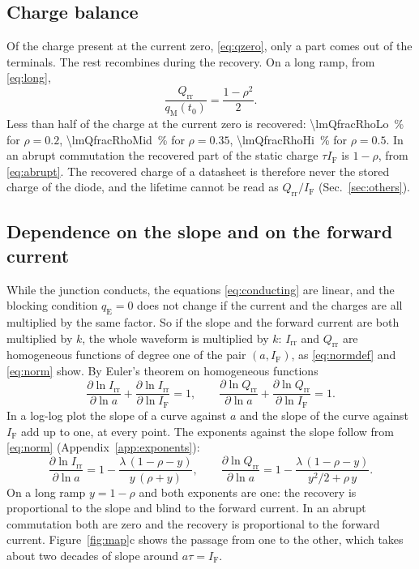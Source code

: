 \documentclass[10pt,a4paper]{scrartcl}
\newcommand{\IF}{I_\mathrm{F}}
\newcommand{\Irr}{I_\mathrm{rr}}
\newcommand{\Qrr}{Q_\mathrm{rr}}
\newcommand{\qE}{q_\mathrm{E}}
\newcommand{\qM}{q_\mathrm{M}}
\begin{document}
\subsection{Charge balance}
Of the charge present at the current zero, \eqref{eq:qzero}, only a part comes out of the terminals. The rest recombines during the recovery. On a long ramp, from \eqref{eq:long},
\begin{equation}
\frac{\Qrr}{\qM(t_0)} = \frac{1-\rho^2}{2} .
\label{eq:fraction}
\end{equation}
Less than half of the charge at the current zero is recovered: \SI{\lmQfracRhoLo}{\percent} for $\rho = 0.2$, \SI{\lmQfracRhoMid}{\percent} for $\rho = 0.35$, \SI{\lmQfracRhoHi}{\percent} for $\rho = 0.5$. In an abrupt commutation the recovered part of the static charge $\tau\IF$ is $1-\rho$, from \eqref{eq:abrupt}. The recovered charge of a datasheet is therefore never the stored charge of the diode, and the lifetime cannot be read as $\Qrr/\IF$ (Sec.~\ref{sec:others}).

\subsection{Dependence on the slope and on the forward current}
\label{sec:exponents}
While the junction conducts, the equations \eqref{eq:conducting} are linear, and the blocking condition $\qE = 0$ does not change if the current and the charges are all multiplied by the same factor. So if the slope and the forward current are both multiplied by $k$, the whole waveform is multiplied by $k$: $\Irr$ and $\Qrr$ are homogeneous functions of degree one of the pair $(a, \IF)$, as \eqref{eq:normdef} and \eqref{eq:norm} show. By Euler's theorem on homogeneous functions
\begin{equation}
\frac{\partial \ln \Irr}{\partial \ln a} + \frac{\partial \ln \Irr}{\partial \ln \IF} = 1 , \qquad
\frac{\partial \ln \Qrr}{\partial \ln a} + \frac{\partial \ln \Qrr}{\partial \ln \IF} = 1 .
\label{eq:euler}
\end{equation}
In a log-log plot the slope of a curve against $a$ and the slope of the curve against $\IF$ add up to one, at every point. The exponents against the slope follow from \eqref{eq:norm} (Appendix~\ref{app:exponents}):
\begin{equation}
\frac{\partial \ln \Irr}{\partial \ln a} = 1 - \frac{\lambda\,(1-\rho-y)}{y\,(\rho+y)} , \qquad
\frac{\partial \ln \Qrr}{\partial \ln a} = 1 - \frac{\lambda\,(1-\rho-y)}{y^2/2+\rho\,y} .
\label{eq:exponents}
\end{equation}
On a long ramp $y = 1-\rho$ and both exponents are one: the recovery is proportional to the slope and blind to the forward current. In an abrupt commutation both are zero and the recovery is proportional to the forward current. Figure~\ref{fig:map}c shows the passage from one to the other, which takes about two decades of slope around $a\tau = \IF$.
\end{document}
